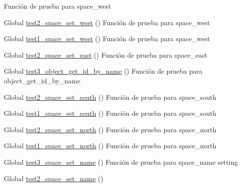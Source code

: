 \begin{DoxyRefList}
%
Función de prueba para space\+\_\+west  
\item[Global \mbox{\hyperlink{space__test_8c_aa51b05ffd99b7bbd8f2dfc23c8f85870}{test2\+\_\+space\+\_\+set\+\_\+west}} ()]\label{test__test000256}%
%
Función de prueba para space\+\_\+west  
\item[Global \mbox{\hyperlink{space__test_8c_ab680a8797f793dffd58546074b87d21f}{test1\+\_\+space\+\_\+set\+\_\+west}} ()]\label{test__test000255}%
%
Función de prueba para space\+\_\+west  
\item[Global \mbox{\hyperlink{space__test_8c_a5df66d103388be4518c379b224f53770}{test2\+\_\+space\+\_\+set\+\_\+east}} ()]\label{test__test000254}%
%
Función de prueba para space\+\_\+east  
\item[Global \mbox{\hyperlink{object__test_8c_a13ab730f1fd81af84d2068341fad5d2d}{test3\+\_\+object\+\_\+get\+\_\+id\+\_\+by\+\_\+name}} ()]\label{test__test000150}%
%
Función de prueba para object\+\_\+get\+\_\+id\+\_\+by\+\_\+name  
\item[Global \mbox{\hyperlink{space__test_8c_ac9f950741f12ccfcc5ad5d9e71d3d90a}{test2\+\_\+space\+\_\+set\+\_\+south}} ()]\label{test__test000252}%
%
Función de prueba para space\+\_\+south  
\item[Global \mbox{\hyperlink{space__test_8c_a21938e16547b3080e9251f960117a859}{test1\+\_\+space\+\_\+set\+\_\+south}} ()]\label{test__test000251}%
%
Función de prueba para space\+\_\+south  
\item[Global \mbox{\hyperlink{space__test_8c_a3bc7fe26c1e36ffd195099a9983206e1}{test2\+\_\+space\+\_\+set\+\_\+north}} ()]\label{test__test000250}%
%
Función de prueba para space\+\_\+north  
\item[Global \mbox{\hyperlink{space__test_8c_a3d3457a89f705948102cf1e5d4a7b45b}{test1\+\_\+space\+\_\+set\+\_\+north}} ()]\label{test__test000249}%
%
Función de prueba para space\+\_\+north  
\item[Global \mbox{\hyperlink{space__test_8c_aa24a337830006e33706ab6ac1c416b47}{test3\+\_\+space\+\_\+set\+\_\+name}} ()]\label{test__test000248}%
%
Función de prueba para space\+\_\+name setting  
\item[Global \mbox{\hyperlink{space__test_8c_a5a868ba017602ba6b58447cb394e81a6}{test2\+\_\+space\+\_\+set\+\_\+name}} ()]\label{test__test000247}%

\end{DoxyRefList}
